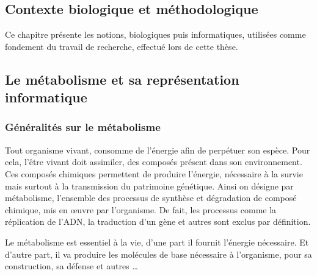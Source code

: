 \begin{refsection}
	\chapter{Contexte biologique et méthodologique}

    Ce chapitre présente les notions, biologiques puis informatiques, utilisées comme fondement du travail de recherche, effectué lors de cette thèse.
    
    
    \section{Le métabolisme et sa représentation informatique}
    \subsection{Généralités sur le métabolisme}
    
    Tout organisme vivant, consomme de l'énergie afin de perpétuer son espèce. Pour cela, l'être vivant doit assimiler, des composés présent dans son environnement. Ces composés chimiques permettent de produire l'énergie, nécessaire à la survie mais surtout à la transmission du patrimoine génétique. Ainsi on désigne par métabolisme, l'ensemble des processus de synthèse et dégradation de composé chimique, mis en œuvre par l'organisme. De fait, les processus comme la réplication de l'\gls{ADN}, la traduction d'un gène et autres sont exclus par définition.
    
    Le métabolisme est essentiel à la vie, d'une part il fournit l'énergie nécessaire. Et d'autre part, il va produire les molécules de base nécessaire à l'organisme, pour sa construction, sa défense et autres \ldots 
    

\end{refsection}
